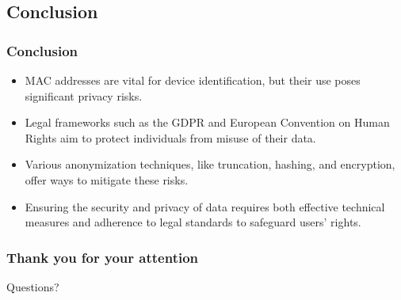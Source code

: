 \documentclass[
english,
svgnames,
notes=hide,
12pt]{beamer}
\begin{document}
\begin{frame}
  \section{Conclusion}
  \frametitle{Conclusion}
  \begin{itemize}
    \item MAC addresses are vital for device identification, but their use poses significant privacy risks. \pause
    \item Legal frameworks such as the GDPR and European Convention on Human Rights aim to protect individuals from misuse of their data. \pause
    \item Various anonymization techniques, like truncation, hashing, and encryption, offer ways to mitigate these risks. \pause
    \item Ensuring the security and privacy of data requires both effective technical measures and adherence to legal standards to safeguard users' rights. 
  \end{itemize}
\end{frame}


\begin{frame}
  \frametitle{Thank you for your attention}
  \begin{center}
    \Huge{Questions?}
  \end{center}
\end{frame}





\end{document}
